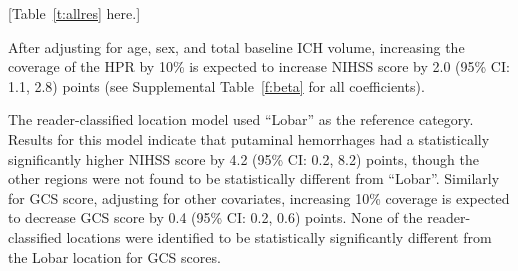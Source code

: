 \documentclass[10pt]{article}\usepackage[]{graphicx}\usepackage[]{color}
\begin{document}
%
%

 



[Table~\ref{t:allres} here.]


After adjusting for age, sex, and total baseline ICH volume, increasing the coverage of the HPR by 10\% is expected to increase NIHSS score by 2.0 (95\% CI: 1.1, 2.8) points (see Supplemental Table~\ref{f:beta} for all coefficients).

The reader-classified location model used ``Lobar'' as the reference category. Results for this model indicate that putaminal hemorrhages had a statistically significantly higher NIHSS score by 4.2 (95\% CI: 0.2, 8.2) points, though the other regions were not found to be statistically different from ``Lobar''. 
Similarly for GCS score, adjusting for other covariates, increasing 10\% coverage is expected to decrease GCS score by 0.4 (95\% CI: 0.2, 0.6) points.  None of the reader-classified locations were identified to be statistically significantly different from the Lobar location for GCS scores.
\end{document}
